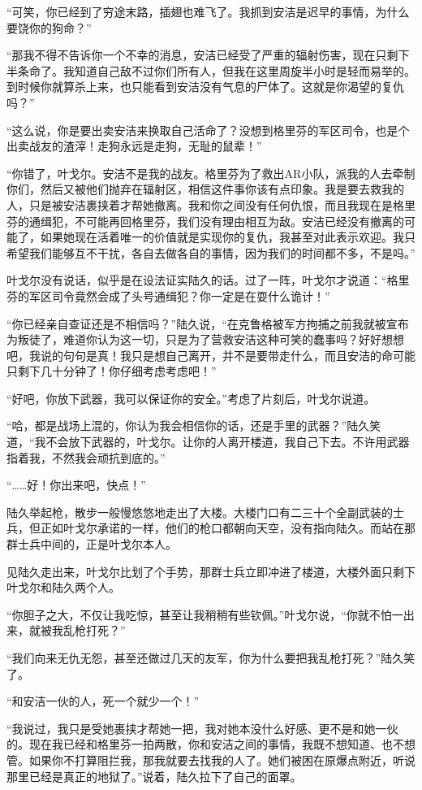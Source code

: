 “可笑，你已经到了穷途末路，插翅也难飞了。我抓到安洁是迟早的事情，为什么要饶你的狗命？”

“那我不得不告诉你一个不幸的消息，安洁已经受了严重的辐射伤害，现在只剩下半条命了。我知道自己敌不过你们所有人，但我在这里周旋半小时是轻而易举的。到时候你就算杀上来，也只能看到安洁没有气息的尸体了。这就是你渴望的复仇吗？”

“这么说，你是要出卖安洁来换取自己活命了？没想到格里芬的军区司令，也是个出卖战友的渣滓！走狗永远是走狗，无耻的鼠辈！”

“你错了，叶戈尔。安洁不是我的战友。格里芬为了救出AR小队，派我的人去牵制你们，然后又被他们抛弃在辐射区，相信这件事你该有点印象。我是要去救我的人，只是被安洁裹挟着才帮她撤离。我和你之间没有任何仇恨，而且我现在是格里芬的通缉犯，不可能再回格里芬，我们没有理由相互为敌。安洁已经没有撤离的可能了，如果她现在活着唯一的价值就是实现你的复仇，我甚至对此表示欢迎。我只希望我们能够互不干扰，各自去做各自的事情，因为我们的时间都不多，不是吗。”

叶戈尔没有说话，似乎是在设法证实陆久的话。过了一阵，叶戈尔才说道：“格里芬的军区司令竟然会成了头号通缉犯？你一定是在耍什么诡计！”

“你已经亲自查证还是不相信吗？”陆久说，“在克鲁格被军方拘捕之前我就被宣布为叛徒了，难道你认为这一切，只是为了营救安洁这种可笑的蠢事吗？好好想想吧，我说的句句是真！我只是想自己离开，并不是要带走什么，而且安洁的命可能只剩下几十分钟了！你仔细考虑考虑吧！”

“好吧，你放下武器，我可以保证你的安全。”考虑了片刻后，叶戈尔说道。

“哈，都是战场上混的，你认为我会相信你的话，还是手里的武器？”陆久笑道，“我不会放下武器的，叶戈尔。让你的人离开楼道，我自己下去。不许用武器指着我，不然我会顽抗到底的。”

“……好！你出来吧，快点！”

陆久举起枪，散步一般慢悠悠地走出了大楼。大楼门口有二三十个全副武装的士兵，但正如叶戈尔承诺的一样，他们的枪口都朝向天空，没有指向陆久。而站在那群士兵中间的，正是叶戈尔本人。

见陆久走出来，叶戈尔比划了个手势，那群士兵立即冲进了楼道，大楼外面只剩下叶戈尔和陆久两个人。

“你胆子之大，不仅让我吃惊，甚至让我稍稍有些钦佩。”叶戈尔说，“你就不怕一出来，就被我乱枪打死？”

“我们向来无仇无怨，甚至还做过几天的友军，你为什么要把我乱枪打死？”陆久笑了。

“和安洁一伙的人，死一个就少一个！”

“我说过，我只是受她裹挟才帮她一把，我对她本没什么好感、更不是和她一伙的。现在我已经和格里芬一拍两散，你和安洁之间的事情，我既不想知道、也不想管。如果你不打算阻拦我，那我就要去找我的人了。她们被困在原爆点附近，听说那里已经是真正的地狱了。”说着，陆久拉下了自己的面罩。

